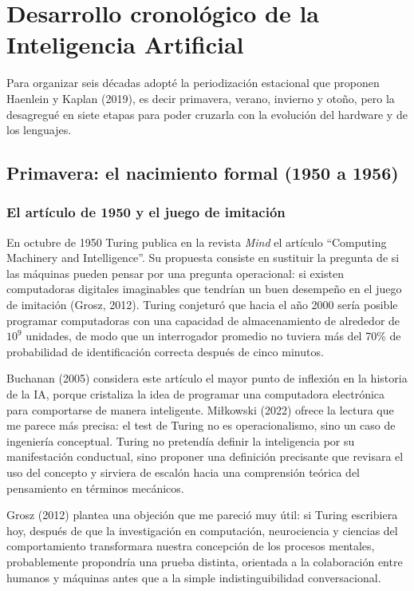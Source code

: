 \documentclass[12pt,letterpaper,oneside]{article}
\begin{document}
\section{Desarrollo cronológico de la Inteligencia Artificial}
\label{sec:cronologia}

Para organizar seis décadas adopté la periodización estacional que proponen Haenlein y Kaplan (2019), es decir primavera, verano, invierno y otoño, pero la desagregué en siete etapas para poder cruzarla con la evolución del hardware y de los lenguajes.

\subsection{Primavera: el nacimiento formal (1950 a 1956)}

\subsubsection{El artículo de 1950 y el juego de imitación}

En octubre de 1950 Turing publica en la revista \textit{Mind} el artículo ``Computing Machinery and Intelligence''. Su propuesta consiste en sustituir la pregunta de si las máquinas pueden pensar por una pregunta operacional: si existen computadoras digitales imaginables que tendrían un buen desempeño en el juego de imitación (Grosz, 2012). Turing conjeturó que hacia el año 2000 sería posible programar computadoras con una capacidad de almacenamiento de alrededor de $10^9$ unidades, de modo que un interrogador promedio no tuviera más del 70\% de probabilidad de identificación correcta después de cinco minutos.

Buchanan (2005) considera este artículo el mayor punto de inflexión en la historia de la IA, porque cristaliza la idea de programar una computadora electrónica para comportarse de manera inteligente. Miłkowski (2022) ofrece la lectura que me parece más precisa: el test de Turing no es operacionalismo, sino un caso de ingeniería conceptual. Turing no pretendía definir la inteligencia por su manifestación conductual, sino proponer una definición precisante que revisara el uso del concepto y sirviera de escalón hacia una comprensión teórica del pensamiento en términos mecánicos.

Grosz (2012) plantea una objeción que me pareció muy útil: si Turing escribiera hoy, después de que la investigación en computación, neurociencia y ciencias del comportamiento transformara nuestra concepción de los procesos mentales, probablemente propondría una prueba distinta, orientada a la colaboración entre humanos y máquinas antes que a la simple indistinguibilidad conversacional.
\end{document}
